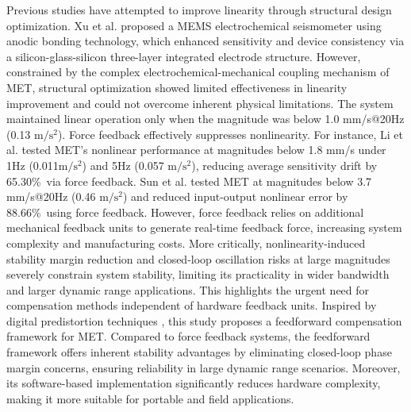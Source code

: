 \documentclass[journal]{IEEEtranTIE}
\newcommand{\valSensitivityDriftSuppressionLI}{65.30\%~}
\newcommand{\valNonlinearSuppressionSUN}{88.66\%~}
\begin{document}
{    Previous studies have attempted to improve linearity through structural design optimization. Xu et al. \cite{9481294} proposed a MEMS electrochemical seismometer using anodic bonding technology, which enhanced sensitivity and device consistency via a silicon-glass-silicon three-layer integrated electrode structure. However, constrained by the complex electrochemical-mechanical coupling mechanism of MET, structural optimization showed limited effectiveness in linearity improvement and could not overcome inherent physical limitations. The system maintained linear operation only when the magnitude was below 1.0 mm/s@20Hz (0.13 $\text{m}/\text{s}^2$). Force feedback effectively suppresses nonlinearity. For instance, Li et al. \cite{li_electrochemical_2017} tested MET's nonlinear performance at magnitudes below 1.8 mm/s under 1Hz (0.011$\text{m}/\text{s}^2$) and 5Hz (0.057 $\text{m}/\text{s}^2$), reducing average sensitivity drift by \valSensitivityDriftSuppressionLI via force feedback. Sun et al. \cite{WOS:000408118700046} tested MET at magnitudes below 3.7 mm/s@20Hz (0.46 $\text{m}/\text{s}^2$) and reduced input-output nonlinear error by \valNonlinearSuppressionSUN using force feedback. However, force feedback relies on additional mechanical feedback units to generate real-time feedback force, increasing system complexity and manufacturing costs. More critically, nonlinearity-induced stability margin reduction and closed-loop oscillation risks at large magnitudes severely constrain system stability, limiting its practicality in wider bandwidth and larger dynamic range applications. This highlights the urgent need for compensation methods independent of hardware feedback units. Inspired by digital predistortion techniques \cite{wangInputAmplitudeBasedAdaptive2024}, this study proposes a feedforward compensation framework for MET. Compared to force feedback systems, the feedforward framework offers inherent stability advantages by eliminating closed-loop phase margin concerns, ensuring reliability in large dynamic range scenarios. Moreover, its software-based implementation significantly reduces hardware complexity, making it more suitable for portable and field applications.
}
\end{document}
